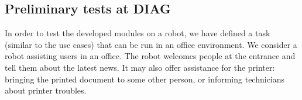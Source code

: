 %
%
%

\subsection{Preliminary tests at DIAG}

In order to test the developed modules on a robot, we have defined a task (similar to the \coaches use cases) that can be run in an office environment.
We consider a robot assisting users in an office. The robot welcomes people at the entrance and tell them about the latest news. It may also offer assistance for the printer: bringing the printed document to some other person, or informing technicians about printer troubles.

